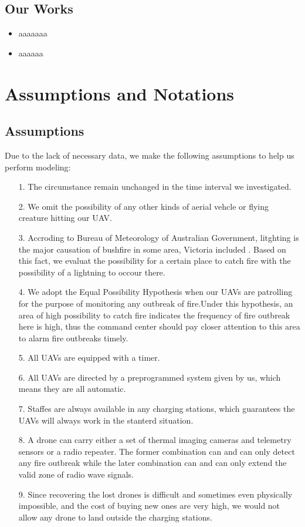 \documentclass[13pt]{ctexart} %
\begin{document}
\subsection{Our Works}
\begin{itemize}
    \item aaaaaaa
    \item aaaaaa
\end{itemize}
\fancyfoot[C]{\bfseries\thepage}

\section{Assumptions and Notations}
\vspace{-10pt}
\subsection{Assumptions}
Due to the lack of necessary data, we make the following assumptions to help us perform modeling:

\begin{itemize}[itemsep=0.3ex, leftmargin=1.2cm]
    \item[1.] The circumstance remain unchanged in the time interval we investigated.
    \item[2.] We omit the possibility of any other kinds of aerial vehcle or flying creature hitting our UAV.
    \item[3.] Accroding to Bureau of Meteorology of Australian Government, litghting is the major causation of bushfire in some area, Victoria included \cite{au-gov-weather}. Based on this fact, we evaluat the possibility for a certain place to catch fire with the possibility of a lightning to occour there.
    \item[4.]  We adopt the Equal Possibility Hypothesis when our UAVs are patrolling for the purpose of monitoring any outbreak of fire.Under this hypothesis, an area of high possibility to catch fire indicates the frequency of fire outbreak here is high, thus the command center should pay closer attention to this area to alarm fire outbreaks timely.
    \item[5.] All UAVs are equipped with a timer.
    \item[6.] All UAVs are directed by a preprogrammed system given by us, which means they are all automatic.
    \item[7.] Staffes are always available in any charging stations, which guarantees the UAVs will always work in the stanterd situation.
    \item[8.] A drone can carry either a set of thermal imaging cameras and telemetry sensors or a radio repeater. The former combination can and can only detect any fire outbreak while the later combination can and can only extend the valid zone of radio wave signals.
   \item[9.]\label{ampt09} Since recovering the lost drones is difficult and sometimes even physically impossible, and the cost of buying new ones are very high, we would not allow any drone to land outside the charging stations.

\end{itemize}
\end{document}
